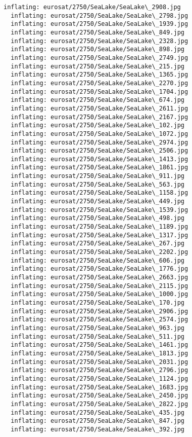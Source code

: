 \documentclass[11pt]{article}
\begin{document}
\begin{Verbatim}[commandchars=\\\{\}]
  inflating: eurosat/2750/SeaLake/SeaLake\_2908.jpg
  inflating: eurosat/2750/SeaLake/SeaLake\_2798.jpg
  inflating: eurosat/2750/SeaLake/SeaLake\_1939.jpg
  inflating: eurosat/2750/SeaLake/SeaLake\_849.jpg
  inflating: eurosat/2750/SeaLake/SeaLake\_2328.jpg
  inflating: eurosat/2750/SeaLake/SeaLake\_898.jpg
  inflating: eurosat/2750/SeaLake/SeaLake\_2749.jpg
  inflating: eurosat/2750/SeaLake/SeaLake\_215.jpg
  inflating: eurosat/2750/SeaLake/SeaLake\_1365.jpg
  inflating: eurosat/2750/SeaLake/SeaLake\_2270.jpg
  inflating: eurosat/2750/SeaLake/SeaLake\_1704.jpg
  inflating: eurosat/2750/SeaLake/SeaLake\_674.jpg
  inflating: eurosat/2750/SeaLake/SeaLake\_2611.jpg
  inflating: eurosat/2750/SeaLake/SeaLake\_2167.jpg
  inflating: eurosat/2750/SeaLake/SeaLake\_102.jpg
  inflating: eurosat/2750/SeaLake/SeaLake\_1072.jpg
  inflating: eurosat/2750/SeaLake/SeaLake\_2974.jpg
  inflating: eurosat/2750/SeaLake/SeaLake\_2506.jpg
  inflating: eurosat/2750/SeaLake/SeaLake\_1413.jpg
  inflating: eurosat/2750/SeaLake/SeaLake\_1861.jpg
  inflating: eurosat/2750/SeaLake/SeaLake\_911.jpg
  inflating: eurosat/2750/SeaLake/SeaLake\_563.jpg
  inflating: eurosat/2750/SeaLake/SeaLake\_1158.jpg
  inflating: eurosat/2750/SeaLake/SeaLake\_449.jpg
  inflating: eurosat/2750/SeaLake/SeaLake\_1539.jpg
  inflating: eurosat/2750/SeaLake/SeaLake\_498.jpg
  inflating: eurosat/2750/SeaLake/SeaLake\_1189.jpg
  inflating: eurosat/2750/SeaLake/SeaLake\_1317.jpg
  inflating: eurosat/2750/SeaLake/SeaLake\_267.jpg
  inflating: eurosat/2750/SeaLake/SeaLake\_2202.jpg
  inflating: eurosat/2750/SeaLake/SeaLake\_606.jpg
  inflating: eurosat/2750/SeaLake/SeaLake\_1776.jpg
  inflating: eurosat/2750/SeaLake/SeaLake\_2663.jpg
  inflating: eurosat/2750/SeaLake/SeaLake\_2115.jpg
  inflating: eurosat/2750/SeaLake/SeaLake\_1000.jpg
  inflating: eurosat/2750/SeaLake/SeaLake\_170.jpg
  inflating: eurosat/2750/SeaLake/SeaLake\_2906.jpg
  inflating: eurosat/2750/SeaLake/SeaLake\_2574.jpg
  inflating: eurosat/2750/SeaLake/SeaLake\_963.jpg
  inflating: eurosat/2750/SeaLake/SeaLake\_511.jpg
  inflating: eurosat/2750/SeaLake/SeaLake\_1461.jpg
  inflating: eurosat/2750/SeaLake/SeaLake\_1813.jpg
  inflating: eurosat/2750/SeaLake/SeaLake\_2031.jpg
  inflating: eurosat/2750/SeaLake/SeaLake\_2796.jpg
  inflating: eurosat/2750/SeaLake/SeaLake\_1124.jpg
  inflating: eurosat/2750/SeaLake/SeaLake\_1683.jpg
  inflating: eurosat/2750/SeaLake/SeaLake\_2450.jpg
  inflating: eurosat/2750/SeaLake/SeaLake\_2822.jpg
  inflating: eurosat/2750/SeaLake/SeaLake\_435.jpg
  inflating: eurosat/2750/SeaLake/SeaLake\_847.jpg
  inflating: eurosat/2750/SeaLake/SeaLake\_392.jpg

\end{Verbatim}
\end{document}
